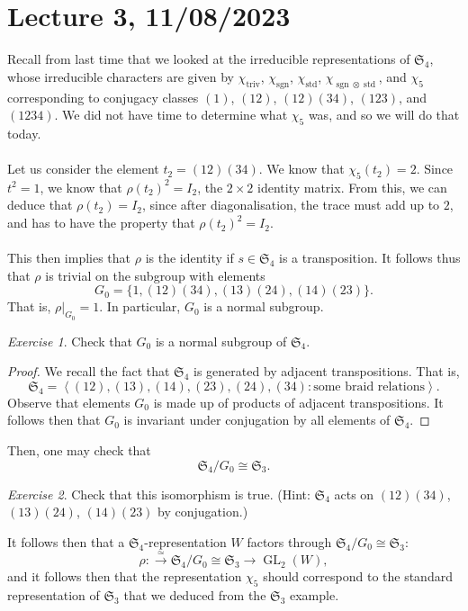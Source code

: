 \documentclass[a4paper]{report}
\theoremstyle{definition}
\theoremstyle{remark}
\theoremstyle{proposition}
\theoremstyle{conjecture}
\theoremstyle{lemma}
\theoremstyle{corollary}
\theoremstyle{exercise}
\newtheorem{exercise}{Exercise}
\theoremstyle{example}
\newcommand{\on}{\operatorname}
\begin{document}
\section{Lecture 3, 11/08/2023}

Recall from last time that we looked at the irreducible representations of 
$\mathfrak{S}_4$, whose irreducible characters are given by 
$\chi_{\on{triv}}$, $\chi_{\on{sgn}}$, $\chi_{\on{std}}$, 
$\chi_{\on{sgn}\otimes \on{std}}$, and $\chi_{5}$ 
corresponding to conjugacy classes
$(1)$, $(12)$, $(12)(34)$, $(123)$, and $(1234)$.
We did not have time to determine what $\chi_5$ was, and so we will do that 
today.\\\\
Let us consider the element $t_2 = (12)(34)$. We know that 
$\chi_5(t_2) = 2$. Since $t^2 = 1$, we know that 
$\rho(t_2)^2 = I_2$, the $2\times 2$ identity matrix. From this, we can deduce
that $\rho(t_2) = I_2$, since after diagonalisation, the trace must 
add up to $2$, and has to have the property that $\rho(t_2)^2 = I_2$.\\\\
This then implies that $\rho$ is the identity if $s \in \mathfrak{S}_4$ 
is a transposition. It follows thus that $\rho$ is trivial on the subgroup
with elements $$G_0 = \lbrace 1, (12)(34), (13)(24), (14)(23)\rbrace.$$
That is, $\rho\vert_{G_0} = 1$. In particular, $G_0$ is a normal 
subgroup.
\begin{exercise}
    Check that $G_0$ is a normal subgroup of $\mathfrak{S}_4$.
\end{exercise}

\begin{proof}
    We recall the fact that $\mathfrak{S}_4$ is generated by adjacent 
    transpositions. That is, 
    $$\mathfrak{S}_4 = \left\langle (12), (13), (14), (23),(24),(34) : \text{some braid relations}\right\rangle.$$
    Observe that elements $G_0$ is made up of products of adjacent 
    transpositions. It 
    follows then that $G_0$ is invariant under conjugation by all elements of 
    $\mathfrak{S}_4$.
\end{proof}
Then, one may check that 
$$\mathfrak{S}_4/G_0 \cong \mathfrak{S}_3.$$
\begin{exercise}
    Check that this isomorphism is true. (Hint: $\mathfrak{S}_4$ acts on 
    $(12)(34)$, $(13)(24)$, $(14)(23)$ by conjugation.)
\end{exercise}


It follows then that a $\mathfrak{S}_4$-representation $W$ factors through 
$\mathfrak{S}_4/G_0\cong\mathfrak{S}_3$: 
$$\rho : \stackrel{\simeq}{\longrightarrow} \mathfrak{S}_4/G_0\cong \mathfrak{S}_3 \longrightarrow \on{GL}_2(W),$$
and it follows then that the representation $\chi_5$ should correspond
to the standard representation of $\mathfrak{S}_3$ that we deduced 
from the $\mathfrak{S}_3$ example.
\end{document}
